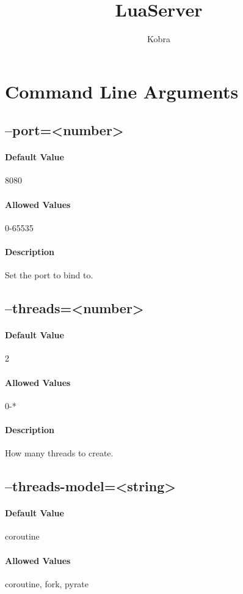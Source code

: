 \documentclass[a4paper,11pt]{report}
\title{LuaServer}
\author{Kobra}
\begin{document}
\maketitle
\tableofcontents

\chapter{Command Line Arguments}

\section{--port=<number>}
\subsubsection{Default Value}{8080}
\subsubsection{Allowed Values}{0-65535}
\subsubsection{Description}{Set the port to bind to.}

\section{--threads=<number>}
\subsubsection{Default Value}{2}
\subsubsection{Allowed Values}{0-*}
\subsubsection{Description}{How many threads to create.}

\section{--threads-model=<string>}
\subsubsection{Default Value}{coroutine}
\subsubsection{Allowed Values}{coroutine, fork, pyrate}
\end{document}
